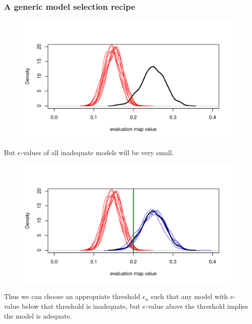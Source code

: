 \documentclass[handout,10pt]{beamer}
\begin{document}
\begin{frame}
\frametitle{A generic model selection recipe}

\begin{figure}
\centering
\includegraphics[width=.9\textwidth]{fullplot}
\end{figure}

But $e$-values of all inadequate models will be very small.

\end{frame}


\begin{frame}

\begin{figure}
\centering
\includegraphics[width=.9\textwidth]{fullplot2}
\end{figure}

Thus we can choose an appropriate threshold $\epsilon_n$ such that any model with $e$-value below that threshold is inadequate, but $e$-value above the threshold implies the model is adequate.
\end{frame}

\end{document}
